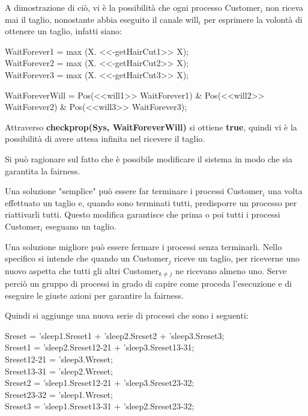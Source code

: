 A dimostrazione di ciò, vi è la possibilità che ogni processo \textsf{Customer$_{i}$} non riceva mai il taglio, nonostante abbia eseguito il canale \textsf{will$_{i}$} per esprimere la volontà di ottenere un taglio, infatti siano:\\
\begin{center}
	\textsf{WaitForever1 = max (X. <<-getHairCut1>> X);}\\
	\textsf{WaitForever2 = max (X. <<-getHairCut2>> X);}\\
	\textsf{WaitForever3 = max (X. <<-getHairCut3>> X);}\\\mbox{}
	
	
	\textsf{WaitForeverWill = Pos(<<will1>> WaitForever1) \& Pos(<<will2>> WaitForever2) \& Pos(<<will3>> WaitForever3);}
\end{center}

Attraverso \textbf{checkprop(Sys, WaitForeverWill)} si ottiene \textbf{true}, quindi vi è la possibilità di avere attesa infinita nel ricevere il taglio.

Si può ragionare sul fatto che è possibile modificare il sistema in modo che sia garantita la fairness.

Una soluzione "semplice" può essere far terminare i processi \textsf{Customer$_{i}$} una volta effettuato un taglio e, quando sono terminati tutti, predisporre un processo per riattivarli tutti. Questo modifica garantisce che prima o poi tutti i processi \textsf{Customer$_{i}$} eseguano un taglio.

Una soluzione migliore può essere fermare i processi senza terminarli. Nello specifico si intende che quando un \textsf{Customer$_{j}$} riceve un taglio, per riceverne uno nuovo aspetta che tutti gli altri \textsf{Customer$_{k\not=j}$} ne ricevano almeno uno. Serve perciò un gruppo di processi in grado di capire come proceda l'esecuzione e di eseguire le giuste azioni per garantire la fairness.

Quindi si aggiunge una nuova serie di processi che sono i seguenti:

\textsf{Sreset = 'sleep1.Sreset1 + 'sleep2.Sreset2 + 'sleep3.Sreset3;}\\
 \textsf{Sreset1 = 'sleep2.Sreset12-21 + 'sleep3.Sreset13-31;}\\
 \textsf{Sreset12-21 = 'sleep3.Wreset;} \\
 \textsf{Sreset13-31 = 'sleep2.Wreset; }\\
 \textsf{Sreset2 = 'sleep1.Sreset12-21 + 'sleep3.Sreset23-32;}\\
 \textsf{Sreset23-32 = 'sleep1.Wreset;} \\
 \textsf{Sreset3 = 'sleep1.Sreset13-31 + 'sleep2.Sreset23-32;}\\


